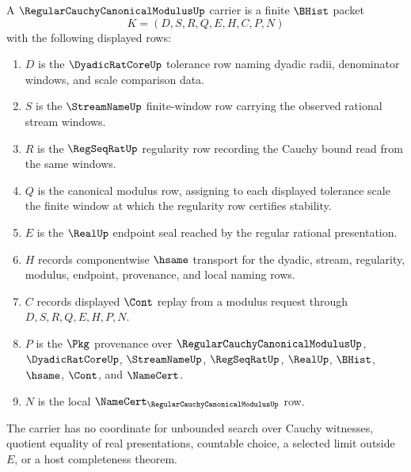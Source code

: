 \begin{definition}
\label{def:regular-cauchy-canonical-modulus-carrier}
A $\RegularCauchyCanonicalModulusUp$ carrier is a finite $\BHist$ packet
$$
K=(D,S,R,Q,E,H,C,P,N)
$$
with the following displayed rows:
\begin{enumerate}
\item $D$ is the $\DyadicRatCoreUp$ tolerance row naming dyadic radii, denominator windows, and scale comparison data.
\item $S$ is the $\StreamNameUp$ finite-window row carrying the observed rational stream windows.
\item $R$ is the $\RegSeqRatUp$ regularity row recording the Cauchy bound read from the same windows.
\item $Q$ is the canonical modulus row, assigning to each displayed tolerance scale the finite window at which the regularity row certifies stability.
\item $E$ is the $\RealUp$ endpoint seal reached by the regular rational presentation.
\item $H$ records componentwise $\hsame$ transport for the dyadic, stream, regularity, modulus, endpoint, provenance, and local naming rows.
\item $C$ records displayed $\Cont$ replay from a modulus request through $D,S,R,Q,E,H,P,N$.
\item $P$ is the $\Pkg$ provenance over $\RegularCauchyCanonicalModulusUp$, $\DyadicRatCoreUp$, $\StreamNameUp$, $\RegSeqRatUp$, $\RealUp$, $\BHist$, $\hsame$, $\Cont$, and $\NameCert$.
\item $N$ is the local $\NameCert_{\RegularCauchyCanonicalModulusUp}$ row.
\end{enumerate}
The carrier has no coordinate for unbounded search over Cauchy witnesses, quotient equality of real presentations, countable choice, a selected limit outside $E$, or a host completeness theorem.
\end{definition}


